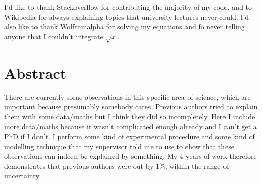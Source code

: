 \documentclass[titlepage,twoside,onecolumn,a4paper,11pt]{report}
\begin{document}
I'd like to thank Stackoverflow for contributing the majority of my code, and to Wikipedia for always explaining topics that university lectures never could. I'd also like to thank Wolframalpha for solving my equations and fo never telling anyone that I couldn't integrate $\sqrt{x}$.

\cleardoublepage


\chapter*{Abstract}
\fancyhead[RO,LE]{\thepage}

There are currently some observations in this specific area of science, which are important because presumably somebody cares. Previous authors tried to explain them with some data/maths but I think they did so incompletely. Here I include more data/maths because it wasn't complicated enough already and I can't get a PhD if I don't. I perform some kind of experimental procedure and some kind of modelling technique that my supervisor told me to use to show that these observations can indeed be explained by something. My 4 years of work therefore demonstrates that previous authors were out by 1\%, within the range of uncertainty.


\cleardoublepage



\fancyhead[RO,LE]{\thepage}
\tableofcontents
\cleardoublepage

\fancyhead[RO,LE]{\thepage}
\listoffigures
\cleardoublepage




\end{document}
